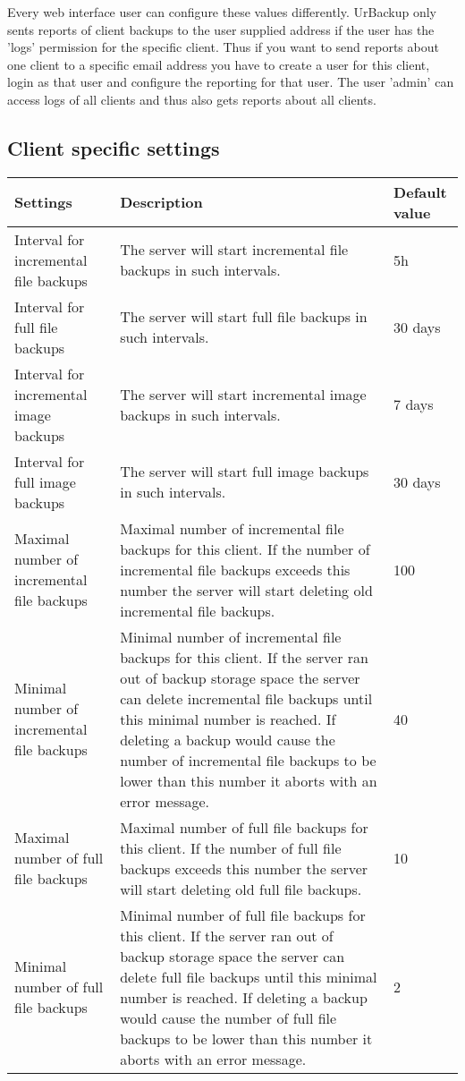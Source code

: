 \documentclass[a4paper,10pt]{article}
\begin{document}
Every web interface user can configure these values differently. UrBackup only sents reports of client backups to the user supplied address if the user has the 'logs' permission for the specific client. Thus if you want to send reports about one client to a specific email address you have to create a user for this client, login as that user and configure the reporting for that user. The user 'admin' can access logs of all clients and thus also gets reports about all clients.

\subsection{Client specific settings}

\begin{longtable}{|p{}|p{}|p{}|}
\hline
Settings  & Description & Default value\\
\hline\hline
Interval for incremental file backups & The server will start incremental file backups in such intervals. & 5h\\
\hline
Interval for full file backups & The server will start full file backups in such intervals. & 30 days\\
\hline
Interval for incremental image backups & The server will start incremental image backups in such intervals. & 7 days\\
\hline
Interval for full image backups & The server will start full image backups in such intervals. & 30 days\\
\hline
Maximal number of incremental file backups & Maximal number of incremental file backups for this client. If the number of
 incremental file backups exceeds this number the server will start deleting old incremental file backups. & 100\\
\hline 
Minimal number of incremental file backups & Minimal number of incremental file backups for this client. If the server ran out of backup storage space the server can delete incremental file backups until this minimal number is reached. If deleting a backup would cause the number of incremental file backups to be lower than this number it aborts with an error message. & 40\\
\hline
Maximal number of full file backups & Maximal number of full file backups for this client. If the number of
 full file backups exceeds this number the server will start deleting old full file backups. & 10\\
\hline
Minimal number of full file backups & Minimal number of full file backups for this client. If the server ran out of backup storage space the server can delete full file backups until this minimal number is reached. If deleting a backup would cause the number of full file backups to be lower than this number it aborts with an error message. & 2\\

\end{longtable}
\end{document}
